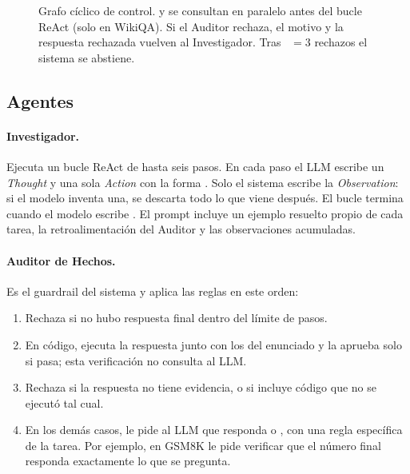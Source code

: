 \begin{figure}[ht]
\caption{Grafo cíclico de control.  y  se consultan en paralelo antes del bucle ReAct (solo en WikiQA). Si el Auditor rechaza, el motivo y la respuesta rechazada vuelven al Investigador. Tras ~$=3$ rechazos el sistema se abstiene.}
\label{fig:grafo}
\end{figure}

\subsection{Agentes}

\paragraph{Investigador.}
Ejecuta un bucle ReAct de hasta seis pasos.
En cada paso el LLM escribe un \emph{Thought} y una sola \emph{Action} con la forma .
Solo el sistema escribe la \emph{Observation}: si el modelo inventa una, se descarta todo lo que viene después.
El bucle termina cuando el modelo escribe .
El prompt incluye un ejemplo resuelto propio de cada tarea, la retroalimentación del Auditor y las observaciones acumuladas.

\paragraph{Auditor de Hechos.}
Es el guardrail del sistema y aplica las reglas en este orden:
\begin{enumerate}
  \item Rechaza si no hubo respuesta final dentro del límite de pasos.
  \item En código, ejecuta la respuesta junto con los  del enunciado y la aprueba solo si pasa; esta verificación no consulta al LLM.
  \item Rechaza si la respuesta no tiene evidencia, o si incluye código que no se ejecutó tal cual.
  \item En los demás casos, le pide al LLM que responda  o , con una regla específica de la tarea. Por ejemplo, en GSM8K le pide verificar que el número final responda exactamente lo que se pregunta.
\end{enumerate}

